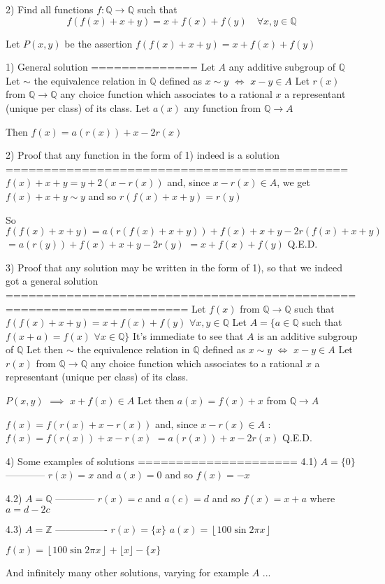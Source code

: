 \begin{solution}
	\begin{tcolorbox}2) Find all functions $f:\mathbb{Q}\to\mathbb{Q}$  such that
\[f(f(x)+x+y)=x+f(x)+f(y) \quad \forall x,y \in \mathbb{Q}\]\end{tcolorbox}
Let $P(x,y)$ be the assertion $f(f(x)+x+y)=x+f(x)+f(y)$

1) General solution 
==============
Let $A$ any additive subgroup of $\mathbb Q$
Let $\sim$ the equivalence relation in $\mathbb Q$ defined as $x\sim y$ $\iff$ $x-y\in A$
Let $r(x)$ from $\mathbb Q\to\mathbb Q$ any choice function which associates to a rational $x$ a representant (unique per class) of its class.
Let $a(x)$ any function from $\mathbb Q\to A$

Then $f(x)=a(r(x))+x-2r(x)$

2) Proof that any function in the form of 1) indeed is a solution
=============================================
$f(x)+x+y=y+2(x-r(x))$ and, since $x-r(x)\in A$, we get $f(x)+x+y\sim y$ and so $r(f(x)+x+y)=r(y)$

So $f(f(x)+x+y)=a(r(f(x)+x+y))+f(x)+x+y-2r(f(x)+x+y)$ $=a(r(y))+f(x)+x+y-2r(y)$ $=x+f(x)+f(y)$
Q.E.D.

3) Proof that any solution may be written in the form of 1), so that we indeed got a general solution
======================================================================
Let $f(x)$ from $\mathbb Q\to\mathbb Q$ such that $f(f(x)+x+y)=x+f(x)+f(y)$ $\forall x,y\in\mathbb Q$
Let $A=\{a\in\mathbb Q$ such that $f(x+a)=f(x)$ $\forall x\in\mathbb Q\}$
It's immediate to see that $A$ is an additive subgroup of $\mathbb Q$
Let then $\sim$ the equivalence relation in $\mathbb Q$ defined as $x\sim y$ $\iff$ $x-y\in A$
Let $r(x)$ from $\mathbb Q\to\mathbb Q$ any choice function which associates to a rational $x$ a representant (unique per class) of its class.

$P(x,y)$ $\implies$ $x+f(x)\in A$
Let then $a(x)=f(x)+x$ from $\mathbb Q\to A$

$f(x)=f(r(x)+x-r(x))$ and, since $x-r(x)\in A$ : $f(x)=f(r(x))+x-r(x)$ $=a(r(x))+x-2r(x)$
Q.E.D.

4) Some examples of solutions
=====================
4.1) $A=\{0\}$
------------
$r(x)=x$ and $a(x)=0$ and so $\boxed{f(x)=-x}$

4.2) $A=\mathbb Q$
------------
$r(x)=c$ and $a(c)=d$ and so $\boxed{f(x)=x+a}$ where $a=d-2c$

4.3) $A=\mathbb Z$
----------------
$r(x)=\{x\}$
$a(x)=\left\lfloor 100\sin 2\pi x\right\rfloor$

$\boxed{f(x)=\left\lfloor 100\sin 2\pi x\right\rfloor+\lfloor x\rfloor -\{x\}}$

And infinitely many other solutions, varying for example $A$
...
\end{solution}




